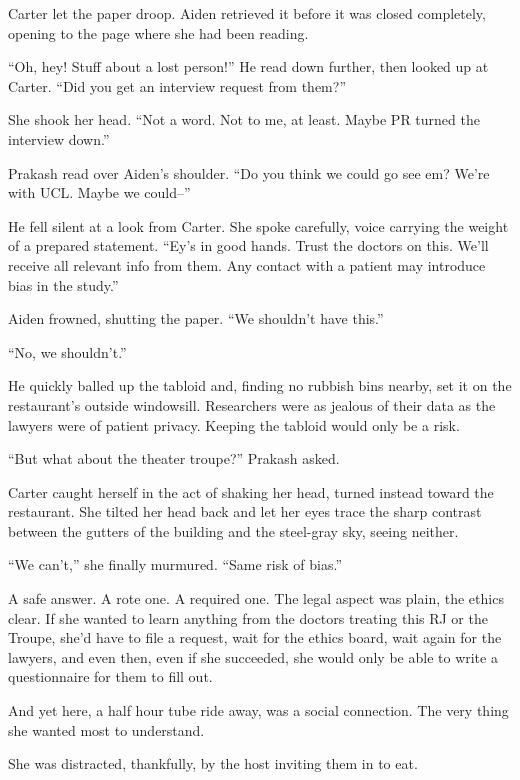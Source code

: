 Carter let the paper droop. Aiden retrieved it before it was closed completely, opening to the page where she had been reading.

``Oh, hey! Stuff about a lost person!'' He read down further, then looked up at Carter. ``Did you get an interview request from them?''

She shook her head. ``Not a word. Not to me, at least. Maybe PR turned the interview down.''

Prakash read over Aiden's shoulder. ``Do you think we could go see em? We're with UCL. Maybe we could--''

He fell silent at a look from Carter. She spoke carefully, voice carrying the weight of a prepared statement. ``Ey's in good hands. Trust the doctors on this. We'll receive all relevant info from them. Any contact with a patient may introduce bias in the study.''

Aiden frowned, shutting the paper. ``We shouldn't have this.''

``No, we shouldn't.''

He quickly balled up the tabloid and, finding no rubbish bins nearby, set it on the restaurant's outside windowsill. Researchers were as jealous of their data as the lawyers were of patient privacy. Keeping the tabloid would only be a risk.

``But what about the theater troupe?'' Prakash asked.

Carter caught herself in the act of shaking her head, turned instead toward the restaurant. She tilted her head back and let her eyes trace the sharp contrast between the gutters of the building and the steel-gray sky, seeing neither.

``We can't,'' she finally murmured. ``Same risk of bias.''

A safe answer. A rote one. A required one. The legal aspect was plain, the ethics clear. If she wanted to learn anything from the doctors treating this RJ or the Troupe, she'd have to file a request, wait for the ethics board, wait again for the lawyers, and even then, even if she succeeded, she would only be able to write a questionnaire for them to fill out.

And yet here, a half hour tube ride away, was a social connection. The very thing she wanted most to understand.

She was distracted, thankfully, by the host inviting them in to eat.
